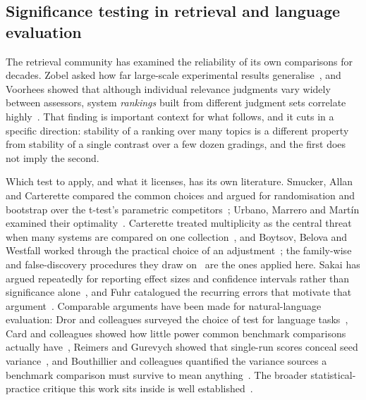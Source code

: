 \subsection{Significance testing in retrieval and language evaluation}

The retrieval community has examined the reliability of its own comparisons for
decades. Zobel asked how far large-scale experimental results
generalise~\cite{zobel1998reliable}, and Voorhees showed that although
individual relevance judgments vary widely between assessors, system
\emph{rankings} built from different judgment sets correlate
highly~\cite{voorhees2000variations}. That finding is important context for what
follows, and it cuts in a specific direction: stability of a ranking over many
topics is a different property from stability of a single contrast over a few
dozen gradings, and the first does not imply the second.

Which test to apply, and what it licenses, has its own literature. Smucker,
Allan and Carterette compared the common choices and argued for randomisation
and bootstrap over the t-test's parametric
competitors~\cite{smucker2007comparison}; Urbano, Marrero and Martín examined
their optimality~\cite{urbano2013comparison}. Carterette treated multiplicity as
the central threat when many systems are compared on one
collection~\cite{carterette2012multiple}, and Boytsov, Belova and Westfall
worked through the practical choice of an adjustment~\cite{boytsov2013deciding};
the family-wise and false-discovery procedures they draw
on~\cite{holm1979simple,benjamini1995controlling} are the ones applied here.
Sakai has argued repeatedly for reporting effect sizes and confidence intervals
rather than significance alone~\cite{sakai2014statistical}, and Fuhr catalogued
the recurring errors that motivate that
argument~\cite{fuhr2018some}. Comparable arguments have been made for
natural-language evaluation: Dror and colleagues surveyed the choice of test for
language tasks~\cite{dror2018hitchhiker}, Card and colleagues showed how little
power common benchmark comparisons actually have~\cite{card2020little}, Reimers
and Gurevych showed that single-run scores conceal seed
variance~\cite{reimers2017reporting}, and Bouthillier and colleagues quantified
the variance sources a benchmark comparison must survive to mean
anything~\cite{bouthillier2021accounting}. The broader statistical-practice
critique this work sits inside is well
established~\cite{ioannidis2005why,simmons2011false,button2013power,wasserstein2016asa,gelman2014statistical,amrhein2019scientists}.

